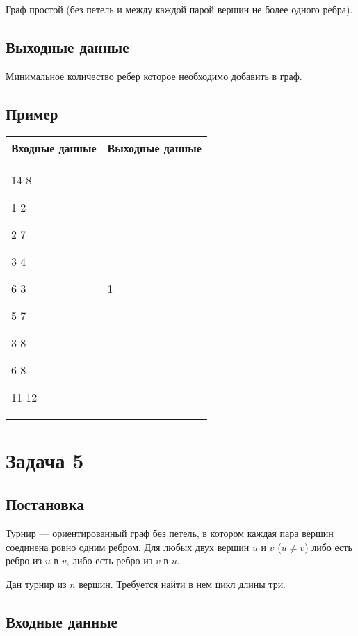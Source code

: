 \documentclass{extarticle}
\begin{document}
Граф простой (без петель и между каждой парой вершин не более одного ребра).

\subsection*{Выходные данные}
\label{sec:orgf07154a}

Минимальное количество ребер которое необходимо добавить в граф.

\subsection*{Пример}
\label{sec:org0505ffb}

\begin{table}[H]
\begin{center}
\begin{tabular}{|m{4cm}|m{4cm}|}
\hline
Входные данные & Выходные данные \\ \hline
14 8

1 2

2 7

3 4

6 3

5 7

3 8

6 8

11 12
&
1
\\ \hline
\end{tabular}
\end{center}
\end{table}


\pagebreak

\section*{Задача 5}
\label{sec:orgfa7945f}
\subsection*{Постановка}
\label{sec:org5660147}

Турнир — ориентированный граф без петель, в котором каждая
пара вершин соединена ровно одним ребром.
Для любых двух вершин \(u\) и \(v\) (\(u \neq v\)) либо есть ребро из
\(u\) в \(v\), либо есть ребро из \(v\) в \(u\).

Дан турнир из \(n\) вершин. Требуется найти в нем цикл длины три.

\subsection*{Входные данные}
\label{sec:org503e97b}
\end{document}
